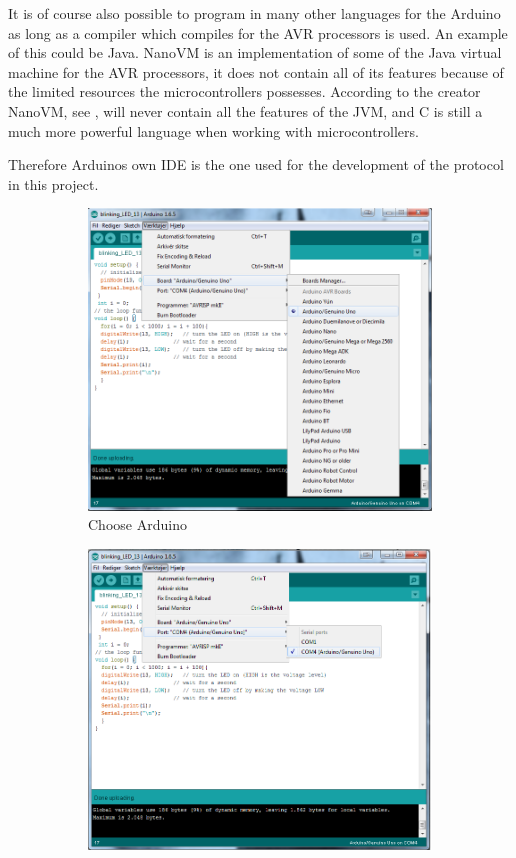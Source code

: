It is of course also possible to program in many other languages for the Arduino as long as a compiler which compiles for the AVR processors is used.
An example of this could be Java.
NanoVM is an implementation of some of the Java virtual machine for the AVR processors, it does not contain all of its features because of the limited resources the microcontrollers possesses. 
According to the creator NanoVM, see \cite{NanoVM}, will never contain all the features of the JVM, and C is still a much more powerful language when working with microcontrollers. 

Therefore Arduinos own IDE is the one used for the development of the protocol in this project.

\begin{figure}[!h]
	\begin{subfigure}{0.47\linewidth}
		\centering
		\includegraphics[width=\linewidth]{Figures/ChooseArduino.png}
		\caption{Choose Arduino}
		\label{fig:choose_arduino}
	\end{subfigure}\hfill
	\begin{subfigure}{0.47\linewidth}
		\centering
		\includegraphics[width=\linewidth]{Figures/ChoosePort.png}

\end{subfigure}
\end{figure}
